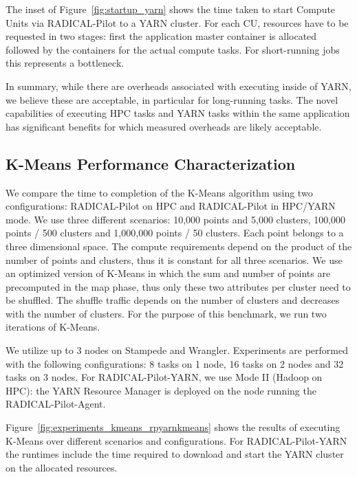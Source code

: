 The inset of Figure~\ref{fig:startup_yarn} shows the time taken to start Compute Units via RADICAL-Pilot to a YARN cluster.
For each CU, resources have to be requested in two stages: first the application master container is allocated followed by the containers for the actual compute tasks.
For short-running jobs this represents a bottleneck.

In summary, while there are overheads associated with executing inside of YARN, we believe these are acceptable, in particular for long-running tasks.
The novel capabilities of executing HPC tasks and YARN tasks within the same application has significant benefits for which measured overheads are likely acceptable.

\subsection{K-Means Performance Characterization}
\label{ssec:kmeans}
We compare the time to completion of the K-Means algorithm using two configurations: RADICAL-Pilot on HPC and RADICAL-Pilot in HPC/YARN mode.
We use three different scenarios: 10,000 points and 5,000 clusters, 100,000 points / 500 clusters and 1,000,000 points / 50 clusters.
Each point belongs to a three dimensional space.
The compute requirements depend on the product of the number of points and clusters, thus it is constant for all three scenarios.
We use an optimized version of K-Means in which the sum and number of points are precomputed in the map phase, thus only these two attributes per cluster need to be shuffled.
The shuffle traffic depends on the number of clusters and decreases with the number of clusters.
For the purpose of this benchmark, we run two iterations of K-Means.

We utilize up to 3 nodes on Stampede and Wrangler.
Experiments are performed with the following configurations: 8 tasks on 1 node, 16 tasks on 2 nodes and 32 tasks on 3 nodes.
For RADICAL-Pilot-YARN, we use Mode II (Hadoop on HPC): the YARN Resource Manager is deployed on the node running the RADICAL-Pilot-Agent.

Figure~\ref{fig:experiments_kmeans_rpyarnkmeans} shows the results of executing K-Means over different scenarios and configurations.
For RADICAL-Pilot-YARN the runtimes include the time required to download and start the YARN cluster on the allocated resources.

